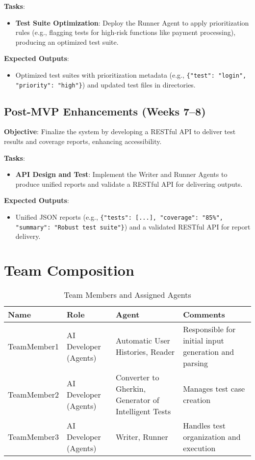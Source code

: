 \documentclass{article}
\begin{document}
\textbf{Tasks}:
\begin{itemize}[label=--]
    \item \textbf{Test Suite Optimization}: Deploy the Runner Agent to apply prioritization rules (e.g., flagging tests for high-risk functions like payment processing), producing an optimized test suite.
\end{itemize}

\textbf{Expected Outputs}:
\begin{itemize}[label=--]
    \item Optimized test suites with prioritization metadata (e.g., \texttt{\{"test": "login", "priority": "high"\}}) and updated test files in directories.
\end{itemize}

\subsection{Post-MVP Enhancements (Weeks 7--8)}
\textbf{Objective}: Finalize the system by developing a RESTful API to deliver test results and coverage reports, enhancing accessibility.

\textbf{Tasks}:
\begin{itemize}[label=--]
    \item \textbf{API Design and Test}: Implement the Writer and Runner Agents to produce unified reports and validate a RESTful API for delivering outputs.
\end{itemize}

\textbf{Expected Outputs}:
\begin{itemize}[label=--]
    \item Unified JSON reports (e.g., \texttt{\{"tests": [...], "coverage": "85\%", "summary": "Robust test suite"\}}) and a validated RESTful API for report delivery.
\end{itemize}

\section{Team Composition}

\begin{table}[h]
\centering
\begin{tabular}{|>{\raggedright\arraybackslash}p{}|>{\raggedright\arraybackslash}p{}|>{\raggedright\arraybackslash}p{}|>{\raggedright\arraybackslash}p{}|}
\hline
\textbf{Name} & \textbf{Role} & \textbf{Agent} & \textbf{Comments} \\ \hline
TeamMember1 & AI Developer (Agents) & Automatic User Histories, Reader & Responsible for initial input generation and parsing \\ \hline
TeamMember2 & AI Developer (Agents) & Converter to Gherkin, Generator of Intelligent Tests & Manages test case creation \\ \hline
TeamMember3 & AI Developer (Agents) & Writer, Runner & Handles test organization and execution \\ \hline
\end{tabular}
\caption{Team Members and Assigned Agents}
\end{table}
\end{document}
